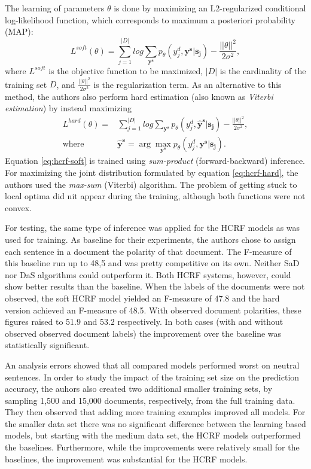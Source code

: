 \documentclass[a4paper,11pt]{article}
\begin{document}
The learning of parameters $\theta$ is done by maximizing an L2-regularized
conditional log-likelihood function, which corresponds to maximum a posteriori
probability (MAP):
\begin{equation}\label{eq:hcrf-soft}
  L^{soft}(\theta) = \sum_{j = 1}^{|D|}log\sum_{\mathbf{y^s}}p_\theta(y_j^d,
  \mathbf{y^s}|\mathbf{s_j}) - \frac{||\theta||^2}{2\sigma^2},
\end{equation}
where $L^{soft}$ is the objective function to be maximized, $|D|$ is the
cardinality of the training set $D$, and $\frac{||\theta||^2}{2\sigma^2}$ is
the regularization term.  As an alternative to this method, the authors also
perform hard estimation (also known as \emph{Viterbi estimation}) by instead
maximizing
\begin{equation}\label{eq:hcrf-hard}
  \begin{split}
  L^{hard}(\theta) =&\sum_{j = 1}^{|D|}log\sum_{\mathbf{y^s}}p_\theta(y_j^d,
  \mathbf{\hat{y}^s}|\mathbf{s_j}) - \frac{||\theta||^2}{2\sigma^2},\\
  \text{where }&\mathbf{\hat{y}^s} = \arg\max_{\mathbf{y^s}}p_\theta(y_j^d,
  \mathbf{y^s}|\mathbf{s_j}).
  \end{split}
\end{equation}
Equation \ref{eq:hcrf-soft} is trained using \emph{sum-product}
(forward-backward) inference. For maximizing the joint distribution formulated
by equation \ref{eq:hcrf-hard}, the authors used the \emph{max-sum} (Viterbi)
algorithm.  The problem of getting stuck to local optima did nit appear during
the training, although both functions were not convex.

For testing, the same type of inference was applied for the HCRF models as was
used for training.  As baseline for their experiments, the authors chose to
assign each sentence in a document the polarity of that document.  The
F-measure of this baseline run up to 48,5 and was pretty competitive on its
own.  Neither SaD nor DaS algorithms could outperform it.  Both HCRF systems,
however, could show better results than the baseline.  When the labels of the
documents were not observed, the soft HCRF model yielded an F-measure of 47.8
and the hard version achieved an F-measure of 48.5.  With observed document
polarities, these figures raised to 51.9 and 53.2 respectively.  In both cases
(with and without observed observed document labels) the improvement over the
baseline was statistically significant.

An analysis errors showed that all compared models performed worst on neutral
sentences.  In order to study the impact of the training set size on the
prediction accuracy, the auhors also created two additional smaller training
sets, by sampling 1,500 and 15,000 documents, respectively, from the full
training data.  They then observed that adding more training examples improved
all models. For the smaller data set there was no significant difference
between the learning based models, but starting with the medium data set, the
HCRF models outperformed the baselines. Furthermore, while the improvements
were relatively small for the baselines, the improvement was substantial for
the HCRF models.
\end{document}
